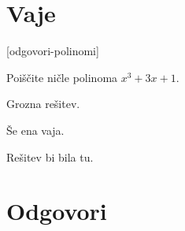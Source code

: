 \section{Vaje}
\label{sec:polinomi-funkcije-vaje}


\def\datotekaOdgovori{odgovori-polinomi}

[\datotekaOdgovori]

%

\begin{vaja}
  Poiščite ničle polinoma $x^3 + 3 x + 1$.

  \begin{odgovor}
    Grozna rešitev.
  \end{odgovor}
\end{vaja}

\begin{vaja}
  Še ena vaja.

  \begin{odgovor}
    Rešitev bi bila tu.
  \end{odgovor}
\end{vaja}




\section{Odgovori}
\label{sec:polinomi-odgovori}





